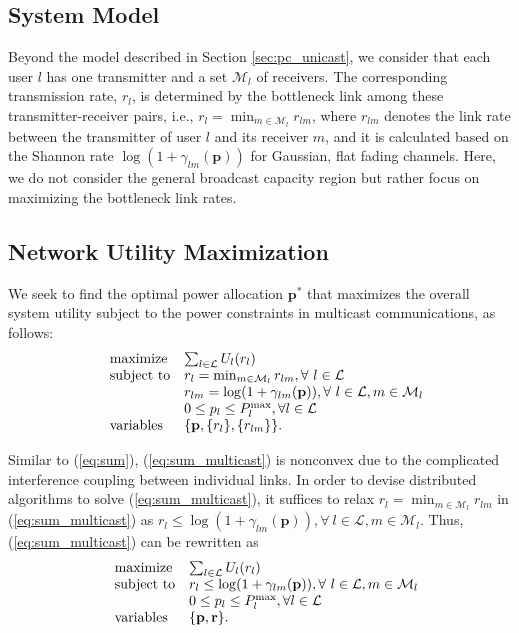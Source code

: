 \documentclass[10pt,journal,letterpaper,compsoc]{IEEEtran}
\begin{document}
{{\subsection{System Model}
Beyond the model described in Section \ref{sec:pc_unicast}, we consider that each user $l$ has one transmitter and a set $\mathcal{M}_l$ of receivers. The corresponding transmission rate, $r_l$, is determined by the bottleneck link among these transmitter-receiver pairs, i.e., $r_l=\min_{m\in\mathcal{M}_l}r_{lm}$, where $r_{lm}$ denotes the link rate between the transmitter of user $l$ and its receiver $m$, and it is calculated based on the Shannon rate $\log(1+\gamma_{lm}(\mathbf{p}))$ for Gaussian, flat fading channels. Here, we do not consider the general broadcast capacity region but rather focus on maximizing the bottleneck link rates.

\subsection{Network Utility Maximization}
We seek to find the optimal power allocation $\mathbf{p}^*$ that maximizes the overall system utility subject to the power constraints in multicast communications, as follows:
\begin{equation}\begin{array}
[c]{lll}&{\text{maximize} }&\sum_{l\in\mathcal{L}}U_l(r_l)
\\
&\text{subject to}& r_l=\min_{m\in\mathcal{M}_l}r_{lm}, \forall~l\in\mathcal{L}
\\
&& r_{lm}=\log(1+\gamma_{lm}(\mathbf{p})), \forall~l\in\mathcal{L}, m\in\mathcal{M}_l
\\
&& 0\leq p_l\leq P_l^{\max}, \forall l\in\mathcal{L}
\\
& \text{variables}& \{\mathbf{p},\{r_l\},\{r_{lm}\}\}.
\end{array}
\label{eq:sum_multicast}
\end{equation}

Similar to (\ref{eq:sum}), (\ref{eq:sum_multicast}) is nonconvex due to the complicated interference coupling between individual links. In order to devise distributed algorithms to solve (\ref{eq:sum_multicast}), it suffices to relax $r_l=\min_{m\in\mathcal{M}_l}r_{lm}$ in (\ref{eq:sum_multicast}) as $r_l\le\log(1+\gamma_{lm}(\mathbf{p})), \forall~l\in\mathcal{L}, m\in\mathcal{M}_l$. Thus, (\ref{eq:sum_multicast}) can be rewritten as
\begin{equation}\begin{array}
[c]{lll}&{\text{maximize} }&\sum_{l\in\mathcal{L}}U_l(r_l)
\\
&\text{subject to}& r_l\le\log(1+\gamma_{lm}(\mathbf{p})), \forall~l\in\mathcal{L}, m\in\mathcal{M}_l
\\
&& 0\leq p_l\leq P_l^{\max}, \forall l\in\mathcal{L}
\\
& \text{variables}& \{\mathbf{p},\mathbf{r}\}.
\end{array}
\label{eq:sum_multicast2}
\end{equation}

}}
\end{document}
